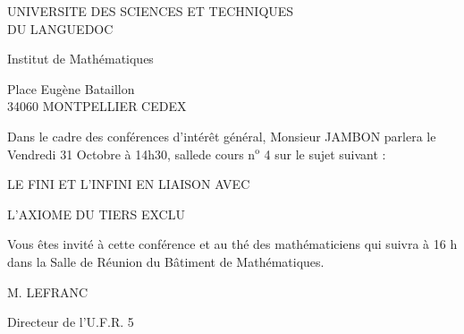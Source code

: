 UNIVERSITE DES SCIENCES ET TECHNIQUES\\
DU LANGUEDOC

Institut de Mathématiques

Place Eugène Bataillon\\
34060 MONTPELLIER CEDEX

Dans le cadre des conférences d'intérêt général, Monsieur JAMBON parlera le Vendredi 31 Octobre à 14h30, sallede cours n$^{\mathrm{o}}$ 4 sur le sujet suivant :

\begin{center}
LE FINI ET L'INFINI EN LIAISON AVEC

L'AXIOME DU TIERS EXCLU
\end{center}

Vous êtes invité à cette conférence et au thé des mathématiciens qui suivra à 16 h dans la Salle de Réunion du Bâtiment de Mathématiques.

\begin{flushright}
M. LEFRANC

Directeur de l'U.F.R. 5
\end{flushright}
